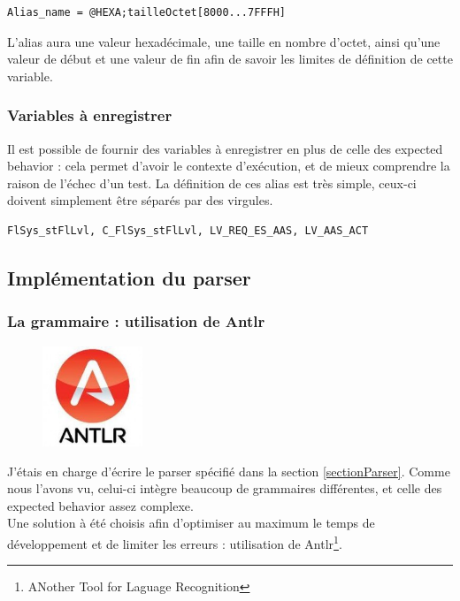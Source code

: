 \begin{lstlisting}[caption=Exemple de définition d'alias local, language=Algo]
Alias_name = @HEXA;tailleOctet[8000...7FFFH]
\end{lstlisting}
L'alias aura une valeur hexadécimale, une taille en nombre d'octet, ainsi qu'une valeur de début et une valeur de fin afin de savoir les limites de définition de cette variable.

\subsubsection{Variables à enregistrer}
Il est possible de fournir des variables à enregistrer en plus de celle des expected behavior : cela permet d'avoir le contexte d'exécution, et de mieux comprendre la raison de l'échec d'un test. La définition de ces alias est très simple, ceux-ci doivent simplement être séparés par des virgules.

\begin{lstlisting}[caption=Exemple de définition d'alias à enregistrer, language=Algo]
FlSys_stFlLvl, C_FlSys_stFlLvl, LV_REQ_ES_AAS, LV_AAS_ACT
\end{lstlisting}

	\subsection{Implémentation du parser}
		\subsubsection{La grammaire : utilisation de Antlr}
		\begin{figure}
			\includegraphics[width=3cm]{contents/images/antlr.jpg}
		\end{figure}
		J'étais en charge d'écrire le parser spécifié dans la section \ref{sectionParser}. Comme nous l'avons vu, celui-ci intègre beaucoup de grammaires différentes, et celle des expected behavior assez complexe. \\
		Une solution à été choisis afin d'optimiser au maximum le temps de développement et de limiter les erreurs : utilisation de Antlr\footnote{ANother Tool for Laguage Recognition}.

